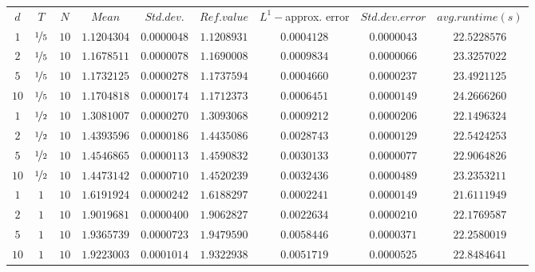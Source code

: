 \begin{tabular}{ccccccccc}
$d$ & $T$ & $N$ & $Mean$ & $Std. dev.$ & $Ref. value$ & $L^1-$approx. error & $Std. dev. error$ & $avg. runtime (s)$\\
$1$ & $\nicefrac{1}{5}$ & $10$ & $1.1204304$ & $0.0000048$ & $1.1208931$ & $0.0004128$ & $0.0000043$ & $22.5228576$\\
$2$ & $\nicefrac{1}{5}$ & $10$ & $1.1678511$ & $0.0000078$ & $1.1690008$ & $0.0009834$ & $0.0000066$ & $23.3257022$\\
$5$ & $\nicefrac{1}{5}$ & $10$ & $1.1732125$ & $0.0000278$ & $1.1737594$ & $0.0004660$ & $0.0000237$ & $23.4921125$\\
$10$ & $\nicefrac{1}{5}$ & $10$ & $1.1704818$ & $0.0000174$ & $1.1712373$ & $0.0006451$ & $0.0000149$ & $24.2666260$\\
$1$ & $\nicefrac{1}{2}$ & $10$ & $1.3081007$ & $0.0000270$ & $1.3093068$ & $0.0009212$ & $0.0000206$ & $22.1496324$\\
$2$ & $\nicefrac{1}{2}$ & $10$ & $1.4393596$ & $0.0000186$ & $1.4435086$ & $0.0028743$ & $0.0000129$ & $22.5424253$\\
$5$ & $\nicefrac{1}{2}$ & $10$ & $1.4546865$ & $0.0000113$ & $1.4590832$ & $0.0030133$ & $0.0000077$ & $22.9064826$\\
$10$ & $\nicefrac{1}{2}$ & $10$ & $1.4473142$ & $0.0000710$ & $1.4520239$ & $0.0032436$ & $0.0000489$ & $23.2353211$\\
$1$ & $1$ & $10$ & $1.6191924$ & $0.0000242$ & $1.6188297$ & $0.0002241$ & $0.0000149$ & $21.6111949$\\
$2$ & $1$ & $10$ & $1.9019681$ & $0.0000400$ & $1.9062827$ & $0.0022634$ & $0.0000210$ & $22.1769587$\\
$5$ & $1$ & $10$ & $1.9365739$ & $0.0000723$ & $1.9479590$ & $0.0058446$ & $0.0000371$ & $22.2580019$\\
$10$ & $1$ & $10$ & $1.9223003$ & $0.0001014$ & $1.9322938$ & $0.0051719$ & $0.0000525$ & $22.8484641$\\
\end{tabular}
